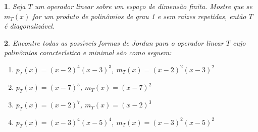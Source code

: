 \documentclass[12pt]{exam}
\newtheorem{exercicio}{}
\begin{document}
\begin{exercicio}
  Seja $T$ um operador linear sobre um espa\c{c}o de dimens\~ao finita. Mostre que se $m_T(x)$ for um produto de polin\^omios de grau 1 e sem ra{\'\i}zes repetidas, ent\~ao $T$ \'e diagonaliz\'avel.
\end{exercicio}

\begin{exercicio}
  Encontre todas as poss{\'\i}veis formas de Jordan para o operador linear $T$ cujo polin\^omios caracter{\'\i}stico e minimal s\~ao como seguem:
  \begin{enumerate}[label=({\alph*})]
    \item $p_T(x) = (x - 2)^4(x - 3)^3$, $m_T(x) = (x - 2)^2(x - 3)^2$
    \item $p_T(x) = (x - 7)^5$, $m_T(x) = (x - 7)^2$
    \item $p_T(x) = (x - 2)^7$, $m_T(x) = (x - 2)^3$
    \item $p_T(x) = (x - 3)^4(x - 5)^4$, $m_T(x) = (x - 3)^2(x - 5)^2$
  \end{enumerate}
  \begin{solucao}
\end{solucao}
\end{exercicio}
\end{document}
